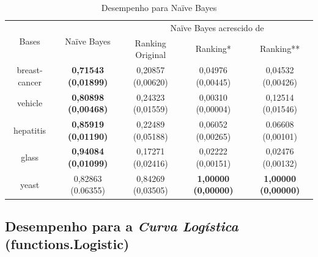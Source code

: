 \begin{table}[h]
    \begin{tabular}{ c c c c c }
        \hline

        \multirow{2}{*}{Bases} & \multirow{2}{*}{Naïve Bayes} & \multicolumn{3}{c}{Naïve Bayes acrescido de} \\ \cline{3-5}
        & & {\small Ranking Original} & {\small Ranking*} & {\small  Ranking**} \\
    
        \hline
        
        breast-cancer & {\small \textbf{0,71543 (0,01899)}} & {\small 0,20857 (0,00620)} & {\small 0,04976 (0,00445)} & {\small 0,04532 (0,00426)} \\
        vehicle & {\small \textbf{0,80898 (0,00468)}} & {\small 0,24323 (0,01559)} & {\small 0,00310 (0,00004)} & {\small 0,12514 (0,01546)} \\
        hepatitis & {\small \textbf{0,85919 (0,01190)}} & {\small 0,22489 (0,05188)} & {\small 0,06052 (0,00265)} & {\small 0.06608 (0,00101)} \\
        glass & {\small \textbf{0,94084 (0,01099)}} & {\small 0,17271 (0,02416)} & {\small 0,02222 (0,00151)} & {\small 0,02476 (0,00132)} \\
        yeast & {\small 0,82863 (0.06355)} & {\small 0,84269 (0,03505)} & {\small \textbf{1,00000 (0,00000)}} & {\small \textbf{1,00000 (0,00000)}} \\
    
        \hline
    \end{tabular}
    
    \caption{Desempenho para Naïve Bayes}
    \label{nb_results_table}
\end{table}

\subsection{Desempenho para a \emph{Curva Logística} (functions.Logistic)}

